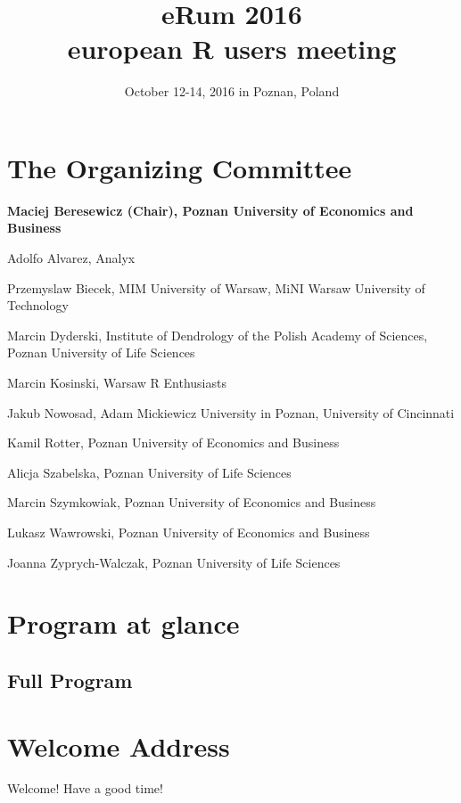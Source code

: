 \documentclass[11pt,oneside]{book}
\title{eRum 2016 \\ european R users meeting}
\author{October 12-14, 2016 in Poznan, Poland}
\date{}
\begin{document}
\frontmatter
\maketitle

\chapter{The Organizing Committee}

\textbf{Maciej Beresewicz (Chair), Poznan University of Economics and Business}

Adolfo Alvarez, Analyx

Przemyslaw Biecek, MIM University of Warsaw, MiNI Warsaw University of Technology

Marcin Dyderski, Institute of Dendrology of the Polish Academy of Sciences, Poznan University of Life Sciences

Marcin Kosinski, Warsaw R Enthusiasts

Jakub Nowosad, Adam Mickiewicz University in Poznan, University of Cincinnati

Kamil Rotter, Poznan University of Economics and Business

Alicja Szabelska, Poznan University of Life Sciences

Marcin Szymkowiak, Poznan University of Economics and Business

Lukasz Wawrowski, Poznan University of Economics and Business

Joanna Zyprych-Walczak, Poznan University of Life Sciences


\chapter{Program at glance}
\noindent{}

\begin{landscape}
\chapter{Full Program}

\end{landscape}

\chapter{Welcome Address}
Welcome! Have a good time!

\tableofcontents
\end{document}
